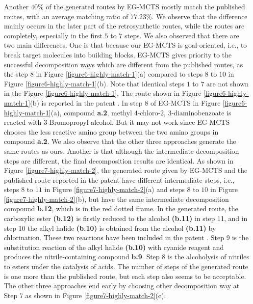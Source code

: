 \documentclass[sn-mathphys,Numbered]{sn-jnl}
\begin{document}
Another $40\%$ of the generated routes by EG-MCTS mostly match the published routes, with an average matching ratio of $77.23\%$.
We observe that the difference mainly occurs in the later part of the retrosynthetic routes, while the routes are completely, especially in the first $5$ to $7$ steps. 
We also observed that there are two main differences. 
One is that because our EG-MCTS is goal-oriented, i.e., to break target molecules into building blocks, EG-MCTS gives priority to the successful decomposition ways which are different from the published routes, as the step $8$ in Figure \ref{figure6-highly-match-1}(a) compared to steps $8$ to $10$ in Figure \ref{figure6-highly-match-1}(b). Note that identical steps $1$ to $7$ are not shown in the Figure \ref{figure6-highly-match-1}. The route shown in Figure \ref{figure6-highly-match-1}(b) is reported in the patent \citep{paten-last}.
In step $8$ of EG-MCTS in Figure \ref{figure6-highly-match-1}(a), compound \textbf{a.2}, methyl 4-chloro-2, 3-diaminobenzoate is reacted with 3-Bromopropyl alcohol. But it may not work since EG-MCTS chooses the less reactive amino group between the two amino groups in compound \textbf{a.2}.
We also observe that the other three approaches generate the same routes as ours.
Another is that although the intermediate decomposition steps are different, the final decomposition results are identical.
As shown in Figure \ref{figure7-highly-match-2}, the generated route given by EG-MCTS and the published route reported in the patent \citep{paten-middle} have different intermediate steps, i.e., steps $8$ to $11$ in Figure \ref{figure7-highly-match-2}(a) and steps $8$ to $10$ in Figure \ref{figure7-highly-match-2}(b), but have the same intermediate decomposition compound \textbf{b.12}, which is in the red dotted frame.
In the generated route, the carboxylic ester \textbf{(b.12)} is firstly reduced to the alcohol \textbf{(b.11)} in step 11, and in step 10 the alkyl halide \textbf{(b.10)} is obtained from the alcohol \textbf{(b.11)} by chlorination. These two reactions have been included in the patent \citep{paten1}.
Step 9 is the substitution reaction of the alkyl halide \textbf{(b.10)} with cyanide reagent and produces the nitrile-containing compound \textbf{b.9}. Step 8 is the alcoholysis of nitriles to esters under the catalysis of acids. The number of steps of the generated route is one more than the published route, but each step also seems to be acceptable.
The other three approaches end early by choosing other decomposition way at Step $7$ as shown in Figure \ref{figure7-highly-match-2}(c).
\end{document}
